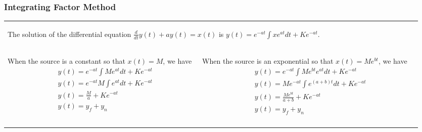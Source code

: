\documentclass[aspectratio=169]{beamer}
\begin{document}
\begin{frame}[fragile]
	\frametitle{Integrating Factor Method}

    		\begin{tabular}{ll}		
    		\begin{columns}
		\begin{column}{1\textwidth}  %
\small The solution of the differential equation $\frac{d}{dt}y(t)+ay(t)=x(t)$ is $y(t)=e^{-at} \int xe^{at}dt+Ke^{-at}$. \newline
		\end{column}
	        \end{columns}\\	
	\begin{columns}
	  \begin{column}{.5\textwidth}  %
\small 	  When the source is a constant so that $x(t)=M$, we have
		\begin{eqnarray}
		&&y(t)=e^{-at} \int Me^{at}dt+Ke^{-at} \nonumber\\
		&&y(t)=e^{-at}M \int e^{at}dt+Ke^{-at} \nonumber\\
		&&y(t)=\frac{M}{a}+Ke^{-at} \nonumber\\
		&&y(t)=y_f+y_n \nonumber\\
		 \nonumber	
		 \end{eqnarray}
	  \end{column}
	  \begin{column}{.5\textwidth}  %
\small 	  When the source is an exponential so that $x(t)=Me^{bt}$, we have
		\begin{eqnarray}
		&&y(t)=e^{-at} \int Me^{bt}e^{at}dt+Ke^{-at} \nonumber\\
		&&y(t)=Me^{-at}\int e^{(a+b)t}dt+Ke^{-at} \nonumber\\
		&&y(t)=\frac{Me^{bt}}{a+b}+Ke^{-at} \nonumber\\
		&&y(t)=y_f+y_n \nonumber\\
		 \nonumber	
		 \end{eqnarray}
	  \end{column}
	\end{columns}
\end{tabular}	

\end{frame}
\end{document}
